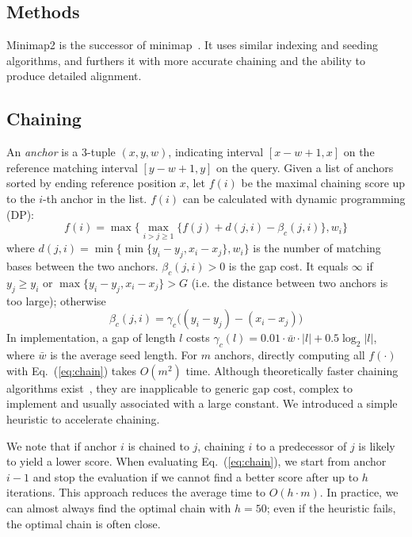 \documentclass{bioinfo}
\begin{document}
\begin{methods}
\section{Methods}

Minimap2 is the successor of minimap~\citep{Li:2016aa}. It uses similar
indexing and seeding algorithms, and furthers it with more accurate chaining
and the ability to produce detailed alignment.

\subsection{Chaining}

An \emph{anchor} is a 3-tuple $(x,y,w)$, indicating interval $[x-w+1,x]$ on the
reference matching interval $[y-w+1,y]$ on the query. Given a list of anchors
sorted by ending reference position $x$, let $f(i)$ be the maximal chaining
score up to the $i$-th anchor in the list. $f(i)$ can be calculated with
dynamic programming (DP):
\begin{equation}\label{eq:chain}
f(i)=\max\big\{\max_{i>j\ge 1} \{ f(j)+d(j,i)-\beta_c(j,i) \},w_i\big\}
\end{equation}
where $d(j,i)=\min\big\{\min\{y_i-y_j,x_i-x_j\},w_i\big\}$ is the number of
matching bases between the two anchors. $\beta_c(j,i)>0$ is the gap cost. It
equals $\infty$ if $y_j\ge y_i$ or $\max\{y_i-y_j,x_i-x_j\}>G$ (i.e. the
distance between two anchors is too large); otherwise
\begin{equation}\label{eq:chain-gap}
\beta_c(j,i)=\gamma_c\big((y_i-y_j)-(x_i-x_j)\big)
\end{equation}
In implementation, a gap of length $l$ costs $\gamma_c(l)=0.01\cdot \bar{w}\cdot
|l|+0.5\log_2|l|$, where $\bar{w}$ is the average seed length. For $m$ anchors, directly computing all $f(\cdot)$ with
Eq.~(\ref{eq:chain}) takes $O(m^2)$ time. Although theoretically faster
chaining algorithms exist~\citep{Abouelhoda:2005aa}, they
are inapplicable to generic gap cost, complex to implement and usually
associated with a large constant. We introduced a simple heuristic to
accelerate chaining.

We note that if anchor $i$ is chained to $j$, chaining $i$ to a predecessor
of $j$ is likely to yield a lower score. When evaluating Eq.~(\ref{eq:chain}),
we start from anchor $i-1$ and stop the evaluation if we cannot find a better
score after up to $h$ iterations. This approach reduces the average time to
$O(h\cdot m)$. In practice, we can almost always find the optimal chain with
$h=50$; even if the heuristic fails, the optimal chain is often close.


\end{methods}
\end{document}
